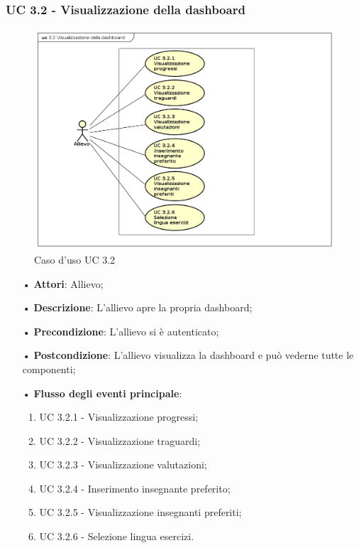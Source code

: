 \subsubsection{UC 3.2 - Visualizzazione della dashboard}
\begin{figure}[H]
\centering
\includegraphics[width=17cm]{img/UC32.png} 
\caption{Caso d'uso UC 3.2}\label{fig:32}
\end{figure}
\begin{itemize}
\item[•]\textbf{Attori}: Allievo;
\item[•]\textbf{Descrizione}: L'allievo apre la propria dashboard;
\item[•]\textbf{Precondizione}: L'allievo si è autenticato;
\item[•]\textbf{Postcondizione}: L'allievo visualizza la dashboard e può vederne tutte le componenti;
\item[•]\textbf{Flusso degli eventi principale}:
\begin{enumerate}
\item UC 3.2.1 - Visualizzazione progressi;
\item UC 3.2.2 - Visualizzazione traguardi;
\item UC 3.2.3 - Visualizzazione valutazioni;
\item UC 3.2.4 - Inserimento insegnante preferito;
\item UC 3.2.5 - Visualizzazione insegnanti preferiti;
\item UC 3.2.6 - Selezione lingua esercizi.
\end{enumerate}
\end{itemize}

